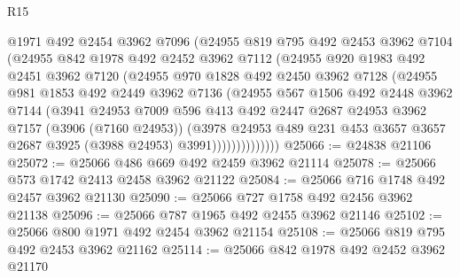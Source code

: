 \begin{lexlean}{R15}
\begin{coremodule}
                @1971
                @492
                @2454
                @3962
                @7096
                (@24955
                  @819
                  @795
                  @492
                  @2453
                  @3962
                  @7104
                  (@24955
                    @842
                    @1978
                    @492
                    @2452
                    @3962
                    @7112
                    (@24955
                      @920
                      @1983
                      @492
                      @2451
                      @3962
                      @7120
                      (@24955
                        @970
                        @1828
                        @492
                        @2450
                        @3962
                        @7128
                        (@24955
                          @981
                          @1853
                          @492
                          @2449
                          @3962
                          @7136
                          (@24955
                            @567
                            @1506
                            @492
                            @2448
                            @3962
                            @7144
                            (@3941
                              @24953
                              @7009
                              @596
                              @413
                              @492
                              @2447
                              @2687
                              @24953
                              @3962
                              @7157
                              (@3906 (@7160 @24953))
                              (@3978
                                @24953
                                @489
                                @231
                                @453
                                @3657
                                @3657
                                @2687
                                @3925
                                (@3988 @24953)
                                @3991))))))))))))))
@25066 := @24838 @21106
@25072 := @25066 @486 @669 @492 @2459 @3962 @21114
@25078 := @25066 @573 @1742 @2413 @2458 @3962 @21122
@25084 := @25066 @716 @1748 @492 @2457 @3962 @21130
@25090 := @25066 @727 @1758 @492 @2456 @3962 @21138
@25096 := @25066 @787 @1965 @492 @2455 @3962 @21146
@25102 := @25066 @800 @1971 @492 @2454 @3962 @21154
@25108 := @25066 @819 @795 @492 @2453 @3962 @21162
@25114 := @25066 @842 @1978 @492 @2452 @3962 @21170

\end{coremodule}
\end{lexlean}
